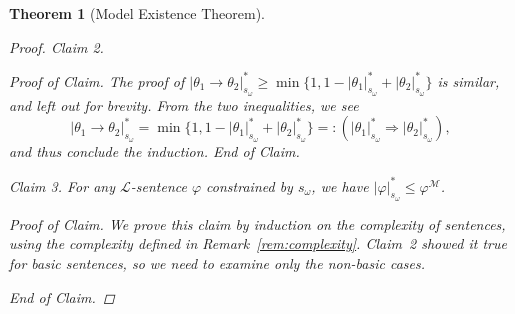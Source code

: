 \documentclass{amsart}
\newtheorem{theorem}{Theorem}[section]
\theoremstyle{definition}
\numberwithin{equation}{theorem}
\renewcommand{\phi}{\varphi}
\newcommand{\narrow}[1]{\xrightarrow{#1}}
\renewcommand{\to}{\narrow{}}
\newenvironment{claim}[1]{\vspace{.07in}\par\noindent\emph{Claim #1.}\space}{}
\newenvironment{claimproof}{\vspace{.07in}\par\noindent\emph{Proof of Claim.}\space}{\hfill \emph{End of Claim.}}
\begin{document}
\begin{theorem}[Model Existence Theorem]
\begin{proof}
\begin{claim}{2}
\begin{claimproof}
        The proof of $|\theta_1\to\theta_2|^*_{s_\omega}\geq\min\{1,1-|\theta_1|^*_{s_\omega}+|\theta_2|^*_{s_\omega}\}$ is similar, and left out for brevity.
        From the two inequalities, we see
        \[
          |\theta_1\to\theta_2|^*_{s_\omega}=\min\{1,1-|\theta_1|^*_{s_\omega}+|\theta_2|^*_{s_\omega}\}=:(|\theta_1|_{s_\omega}^*\Rightarrow|\theta_2|_{s_\omega}^*),
        \] and thus conclude the induction.
      \end{claimproof}
    \end{claim}
    \begin{claim}{3}
      For any $\mathcal L$-sentence $\phi$ constrained by $s_\omega$, we have $|\phi|^*_{s_\omega}\leq\phi^\mathcal M$.
      \begin{claimproof}
        We prove this claim by induction on the complexity of sentences, using the complexity defined in Remark~\ref{rem:complexity}.
        Claim~2 showed it true for basic sentences, so we need to examine only the non-basic cases.
        

\end{claimproof}
\end{claim}
\end{proof}
\end{theorem}
\end{document}

